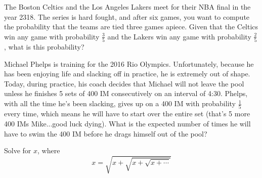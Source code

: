 \begin{problem} The Boston Celtics and the Los Angeles Lakers meet for their  NBA final in the year 2318. The series is hard fought, and after six games, you want to compute the probability that the teams are tied three games apiece. Given that the Celtics win any game with probability $\frac{3}{5}$ and the Lakers win any game with probability $\frac{2}{5}$, what is this probability?
\end{problem}
\begin{problem}Michael Phelps is training for the 2016 Rio Olympics. Unfortunately, because he has been enjoying life and slacking off in practice, he is extremely out of shape. Today, during practice, his coach decides that Michael will not leave the pool unless he finishes 5 sets of 400 IM consecutively on an interval of 4:30. Phelps, with all the time he's been slacking, gives up on a 400 IM with probability $\frac{1}{5}$ every time, which means he will have to start over the entire set (that's 5 more 400 IMs Mike...good luck dying). What is the expected number of times he will have to swim the 400 IM before he drags himself out of the pool?
\end{problem}

\begin{problem}
Solve for $x$, where
\begin{equation}
    x = \sqrt{x+\sqrt{x+\sqrt{x+\cdots}}}
\end{equation}
\end{problem}